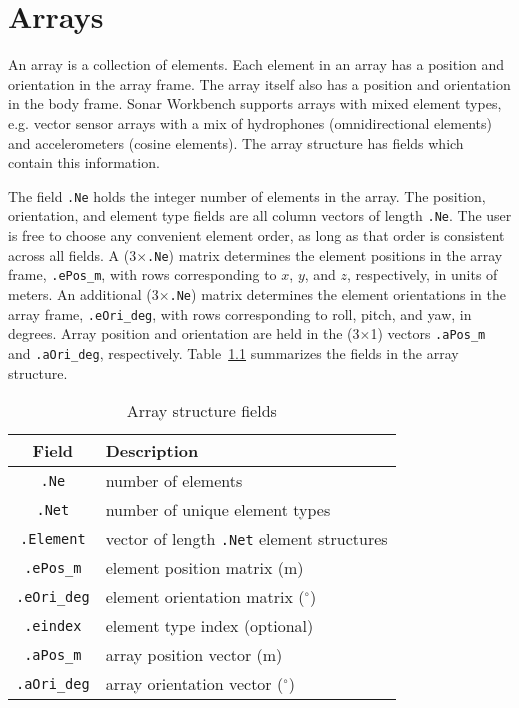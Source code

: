 \chapter{Arrays}\label{ch:array}

An array is a collection of elements. Each element in an array has a position and orientation in the array frame. The array itself also has a position and orientation in the body frame. Sonar Workbench supports arrays with mixed element types, e.g. vector sensor arrays with a mix of hydrophones (omnidirectional elements) and accelerometers (cosine elements). The array structure has fields which contain this information.

The field \texttt{.Ne} holds the integer number of elements in the array. The position, orientation, and element type fields are all column vectors of length \texttt{.Ne}. The user is free to choose any convenient element order, as long as that order is consistent across all fields. A (3$\times$\texttt{.Ne}) matrix determines the element positions in the array frame, \texttt{.ePos\_m}, with rows corresponding to $x$, $y$, and $z$, respectively, in units of meters. An additional (3$\times$\texttt{.Ne}) matrix determines the element orientations in the array frame, \texttt{.eOri\_deg}, with rows corresponding to roll, pitch, and yaw, in degrees. Array position and orientation are held in the (3$\times$1) vectors \texttt{.aPos\_m} and \texttt{.aOri\_deg}, respectively. Table~\ref{tab:ArrayFields} summarizes the fields in the array structure. 

\begin{table}[!ht]
	\begin{center}
		\caption{Array structure fields}
		\label{tab:ArrayFields}
		\begin{tabular}{c|l} 
			\textbf{Field} & \textbf{Description} \\
			\hline
			\texttt{.Ne} & number of elements \\
			\texttt{.Net} & number of unique element types \\
			\texttt{.Element} & vector of length \texttt{.Net} element structures \\
			\texttt{.ePos\_m} & element position matrix (m) \\
			\texttt{.eOri\_deg} & element orientation matrix ($^\circ$) \\
			\texttt{.eindex} & element type index (optional) \\
			\texttt{.aPos\_m} & array position vector (m) \\
			\texttt{.aOri\_deg} & array orientation vector ($^\circ$) \\
		\end{tabular}
	\end{center}
\end{table}

